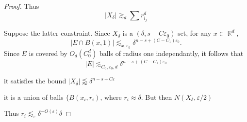 \documentclass[dvipsnames,letterpaper,12pt]{article}
\numberwithin{equation}{section}
\DeclareMathOperator{\RR}{\mathbb{R}}
\numberwithin{theorem}{section}
\begin{document}
\begin{proof}



    Thus
    \[ |X_\delta| \gtrsim_d \sum r_{i_j}^d \]



    Suppose the latter constraint. Since $X_\delta$ is a $(\delta,s - C \varepsilon_0)$ set, for any $x \in \RR^d$,
    \[ |E \cap B(x,1)| \lesssim_{x,\varepsilon_0} \delta^{n - s + (C - C_1) \varepsilon_0}. \]
    Since $E$ is covered by $O_d(C_0^d)$ balls of radius one independantly, it follows that
    \[ |E| \lesssim_{C_0,\varepsilon_0,d} \delta^{n - s + (C - C_1) \varepsilon_0} \]


    it satisfies the bound $|X_\delta| \lessapprox \delta^{n - s + C \varepsilon}$


    it is a union of balls $\{ B(x_i,r_i)$, where $r_i \approx \delta$. But then $N(X_\delta,\varepsilon/2)$


    Thus $r_i \lesssim_\varepsilon \delta^{-O(\varepsilon)} \delta$
\end{proof}

\end{document}
